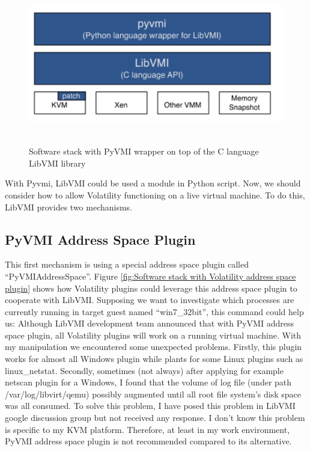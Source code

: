 \begin{figure}[htbp]
	\centering
		\includegraphics[width=14cm, height= 7cm ]{Figures/Figure29.png}
	\caption[Software stack with PyVMI wrapper on top of the C language LibVMI library]{Software stack with PyVMI wrapper on top of the C language LibVMI library}
	\label{fig:Software stack with PyVMI wrapper on top of the C language LibVMI library}
\end{figure}

With Pyvmi, LibVMI could be used a module in Python script. Now, we should consider how to allow Volatility functioning on a live virtual machine. 
To do this, LibVMI provides two mechanisms.

\subsection{PyVMI Address Space Plugin}
This first mechanism is using a special address space plugin called “PyVMIAddressSpace”. Figure \ref{fig:Software stack with Volatility address space plugin}
shows how Volatility plugins could leverage this address space plugin to cooperate with LibVMI. Supposing we want to investigate which 
processes are currently running in target guest named “win7\_32bit”, this command could help us:
Although LibVMI development team announced that with PyVMI address space plugin, all Volatility plugins will work on a running virtual 
machine. With my manipulation we encountered some unexpected problems. Firstly, this plugin works for almost all Windows plugin while 
plants for some Linux plugins such as linux\_netstat. Secondly, sometimes (not always) after applying for example netscan plugin for a 
Windows, I found that the volume of log file (under path /var/log/libvirt/qemu) possibly augmented until all root file system’s disk 
space was all consumed. To solve this problem, I have posed this problem in LibVMI google discussion group but not received any response. 
I don’t know this problem is specific to my KVM platform. Therefore, at least in my work environment, PyVMI address space plugin is not 
recommended compared to its alternative.

